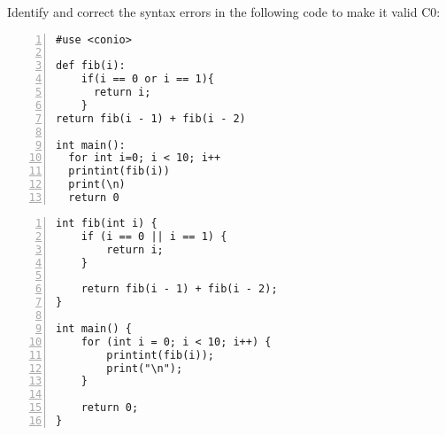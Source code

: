 
Identify and correct the syntax errors in the following code to make
it valid C0:
\begin{lstlisting}[numbers=left]
#use <conio>

def fib(i):
    if(i == 0 or i == 1){
      return i;
    }
return fib(i - 1) + fib(i - 2)

int main():
  for int i=0; i < 10; i++
  printint(fib(i))
  print(\n)
  return 0
\end{lstlisting}
\begin{solution}
\begin{lstlisting}[numbers=left]
int fib(int i) {
    if (i == 0 || i == 1) {
        return i;
    }

    return fib(i - 1) + fib(i - 2);
}

int main() {
    for (int i = 0; i < 10; i++) {
        printint(fib(i));
        print("\n");
    }

    return 0;
}
\end{lstlisting}
\clearpage
\end{solution}
